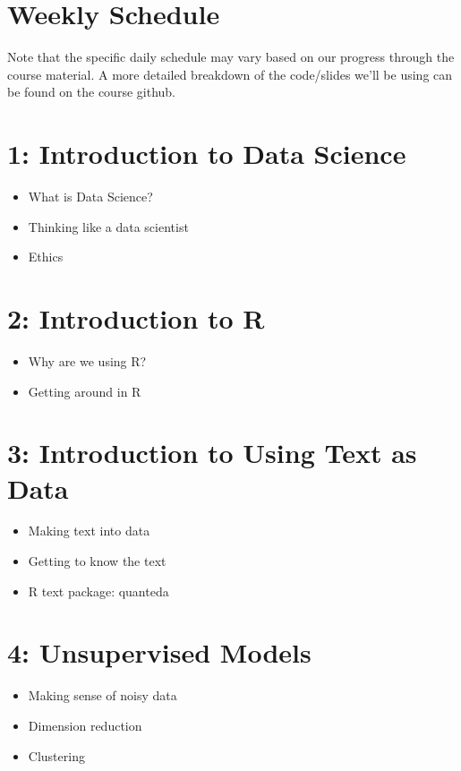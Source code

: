 \documentclass[]{article}
\begin{document}
	\section*{Weekly Schedule}
	Note that the specific daily schedule may vary based on our progress through the course material. A more detailed breakdown of the code/slides we'll be using can be found on the course github.
	
	\section*{\textnormal{1: Introduction to Data Science}}
	\begin{itemize}
		\item What is Data Science?
		\item Thinking like a data scientist
		\item Ethics
	\end{itemize}
	
	\section*{\textnormal{2: Introduction to R}}
	
		\begin{itemize}
			\item Why are we using R?
			\item Getting around in R
		\end{itemize}
		
	\section*{\textnormal{3: Introduction to Using Text as Data }}

		\begin{itemize}
			\item Making text into data
			\item Getting to know the text
			\item R text package: quanteda
		\end{itemize}
	
	\section*{\textnormal{4: Unsupervised Models}}

		\begin{itemize}
			\item Making sense of noisy data
			\item Dimension reduction
			\item Clustering
		\end{itemize}
\end{document}

